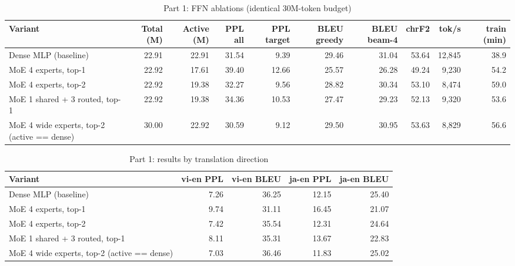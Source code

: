 
\begin{table}[htbp]
  \centering
  \caption{Part 1: FFN ablations (identical 30M-token budget)}
  \label{tab:part1_main}
  \begin{tabular}{lrrrrrrrrr}
    \toprule
    Variant & Total (M) & Active (M) & PPL all & PPL target & BLEU greedy & BLEU beam-4 & chrF2 & tok/s & train (min) \\
    \midrule
    Dense MLP (baseline) & 22.91 & 22.91 & 31.54 & 9.39 & 29.46 & 31.04 & 53.64 & 12,845 & 38.9 \\
    MoE 4 experts, top-1 & 22.92 & 17.61 & 39.40 & 12.66 & 25.57 & 26.28 & 49.24 & 9,230 & 54.2 \\
    MoE 4 experts, top-2 & 22.92 & 19.38 & 32.27 & 9.56 & 28.82 & 30.34 & 53.10 & 8,474 & 59.0 \\
    MoE 1 shared + 3 routed, top-1 & 22.92 & 19.38 & 34.36 & 10.53 & 27.47 & 29.23 & 52.13 & 9,320 & 53.6 \\
    MoE 4 wide experts, top-2 (active == dense) & 30.00 & 22.92 & 30.59 & 9.12 & 29.50 & 30.95 & 53.63 & 8,829 & 56.6 \\
    \bottomrule
  \end{tabular}
\end{table}

\begin{table}[htbp]
  \centering
  \caption{Part 1: results by translation direction}
  \label{tab:part1_lang}
  \begin{tabular}{lrrrr}
    \toprule
    Variant & vi-en PPL & vi-en BLEU & ja-en PPL & ja-en BLEU \\
    \midrule
    Dense MLP (baseline) & 7.26 & 36.25 & 12.15 & 25.40 \\
    MoE 4 experts, top-1 & 9.74 & 31.11 & 16.45 & 21.07 \\
    MoE 4 experts, top-2 & 7.42 & 35.54 & 12.31 & 24.64 \\
    MoE 1 shared + 3 routed, top-1 & 8.11 & 35.31 & 13.67 & 22.83 \\
    MoE 4 wide experts, top-2 (active == dense) & 7.03 & 36.46 & 11.83 & 25.02 \\
    \bottomrule
  \end{tabular}
\end{table}

